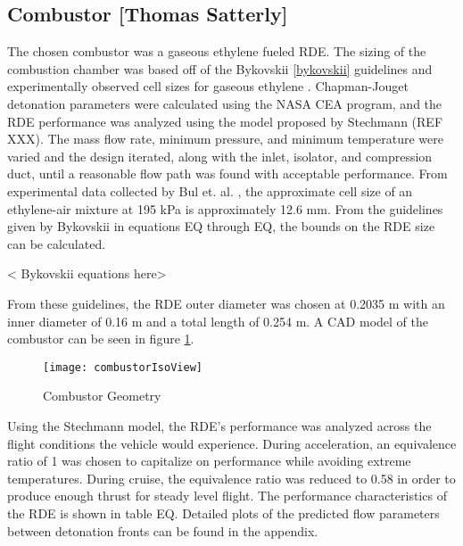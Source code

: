 \subsection{Combustor [Thomas Satterly]}
The chosen combustor was a gaseous ethylene fueled RDE. The sizing of the combustion chamber was based off of the Bykovskii \ref{bykovskii} guidelines and experimentally observed cell sizes for gaseous ethylene \cite{cellsize}. Chapman-Jouget detonation parameters were calculated using the NASA CEA program, and the RDE performance was analyzed using the model proposed by Stechmann (REF XXX). The mass flow rate, minimum pressure, and minimum temperature were varied and the design iterated, along with the inlet, isolator, and compression duct, until a reasonable flow path was found with acceptable performance. 
    From experimental data collected by Bul et. al. \cite{cellsize}, the approximate cell size of an ethylene-air mixture at 195 kPa is approximately 12.6 mm. From the guidelines given by Bykovskii in equations EQ through EQ, the bounds on the RDE size can be calculated.

< Bykovskii equations here>

    From these guidelines, the RDE outer diameter was chosen at 0.2035 m with an inner diameter of 0.16 m and a total length of 0.254 m. A CAD model of the combustor can be seen in figure \ref{fig:combustorIsoView}.

\begin{figure}[H]
\begin{center}
\texttt{[image: combustorIsoView]}
\caption{Combustor Geometry}
\label{fig:combustorIsoView}
\end{center}
\end{figure}

    Using the Stechmann model, the RDE’s performance was analyzed across the flight conditions the vehicle would experience. During acceleration, an equivalence ratio of 1 was chosen to capitalize on performance while avoiding extreme temperatures. During cruise, the equivalence ratio was reduced to 0.58 in order to produce enough thrust for steady level flight. The performance characteristics of the RDE is shown in table EQ. Detailed plots of the predicted flow parameters between detonation fronts can be found in the appendix.

